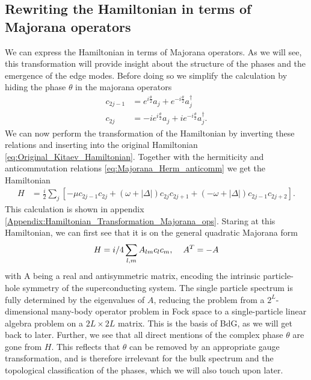 \subsection{Rewriting the Hamiltonian in terms of Majorana operators}
We can express the Hamiltonian in terms of Majorana operators. As we will see, this transformation will provide insight about the structure of the phases and the emergence of the edge modes. Before doing so we simplify the calculation by hiding the phase $\theta$ in the majorana operators
\begin{align}
    c_{2j-1} &= e^{i \frac{\theta}{2}} a_j + e^{-i \frac{\theta}{2}}a_j^\dagger \label{eq:c2j-1_hide_phase}\\
    c_{2j} &= -ie^{i \frac{\theta}{2}} a_j + ie^{-i \frac{\theta}{2}}a_j^\dagger \label{eq:c2j_hide_phase}.
\end{align}
We can now perform the transformation of the Hamiltonian by inverting these relations and inserting into the original Hamiltonian \ref{eq:Original_Kitaev_Hamiltonian}. Together with the hermiticity and anticommutation relations \ref{eq:Majorana_Herm_anticomm} we get the Hamiltonian
\begin{align}
    H &= \frac{i}{2} \sum_j \left[-\mu c_{2j-1} c_{2j} + \left(\omega + \left|\Delta \right|  \right) c_{2j} c_{2j+1} + \left(-\omega + \left| \Delta \right| \right) c_{2j-1} c_{2j+2} \right].
\end{align}
This calculation is shown in appendix \ref{Appendix:Hamiltonian_Transformation_Majorana_ops}. Staring at this Hamiltonian, we can first see that it is on the general quadratic Majorana form
\begin{align}
    H = \frac{i}{4} \sum_{l, m} A_{lm} c_{l} c_m, \hspace{4mm} A^T = -A\label{eq:quadratic_H}
\end{align}
with A being a real and antisymmetric matrix, encoding the intrinsic particle-hole symmetry of the superconducting system. The single particle spectrum is fully determined by the eigenvalues of $A$, reducing the problem from a $2^{L}$-dimensional many-body operator problem in Fock space to a single-particle linear algebra problem on a $2L \times 2L$ matrix. This is the basis of BdG, as we will get back to later. Further, we see that all direct mentions of the complex phase $\theta$ are gone from $H$. This reflects that $\theta$ can be removed by an appropriate gauge transformation, and is therefore irrelevant for the bulk spectrum and the topological classification of the phases, which we will also touch upon later.

